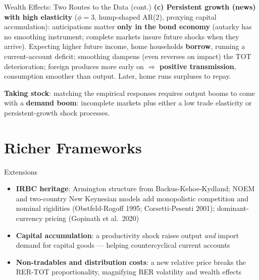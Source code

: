 \documentclass[blue]{beamer}
\begin{document}
\begin{frame}{Wealth Effects: Two Routes to the Data (cont.)}
\bigskip
\textbf{(c) Persistent growth (news) with high elasticity} ($\phi = 3$, hump-shaped AR(2), proxying capital accumulation): anticipations matter \textbf{only in the bond economy} (autarky has no smoothing instrument; complete markets insure future shocks when they arrive). Expecting higher future income, home households \textbf{borrow}, running a current-account deficit; smoothing dampens (even reverses on impact) the TOT deterioration; foreign produces more early on $\Rightarrow$ \textbf{positive transmission}, consumption smoother than output. Later, home runs surpluses to repay.

\medskip
\textbf{Taking stock}: matching the empirical responses requires output booms to come with a \textbf{demand boom}: incomplete markets plus either a low trade elasticity or persistent-growth shock processes.
\end{frame}

\section{Richer Frameworks}

\begin{frame}{Extensions}
\begin{itemize}
    \item \textbf{IRBC heritage}: Armington structure from Backus-Kehoe-Kydland; NOEM and two-country New Keynesian models add monopolistic competition and nominal rigidities (Obstfeld-Rogoff 1995; Corsetti-Pesenti 2001); dominant-currency pricing (Gopinath et al.\ 2020)

    \item \textbf{Capital accumulation}: a productivity shock raises output \emph{and} import demand for capital goods --- helping countercyclical current accounts

    \item \textbf{Non-tradables and distribution costs}: a new relative price breaks the RER-TOT proportionality, magnifying RER volatility and wealth effects

\end{itemize}
\end{frame}
\end{document}
